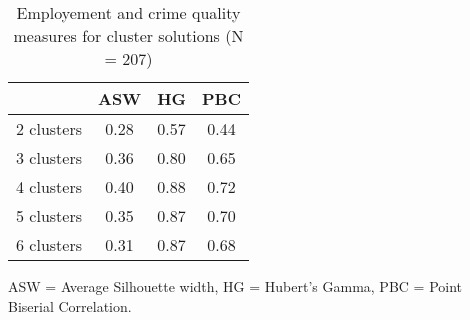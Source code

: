 \begin{table}[htp]
\footnotesize
\setlength{\tabcolsep}{35pt}
\renewcommand{\arraystretch}{1.3}
\begin{threeparttable}
\centering
\caption{Employement and crime quality measures for cluster solutions (N = 207)} 
\label{tab:quality_clusters_job_crime}
\begin{tabular}{lccc}
  \hline
 & ASW & HG & PBC \\ 
  \hline
2 clusters & 0.28 & 0.57 & 0.44 \\ 
  3 clusters & 0.36 & 0.80 & 0.65 \\ 
  4 clusters & 0.40 & 0.88 & 0.72 \\ 
  5 clusters & 0.35 & 0.87 & 0.70 \\ 
  6 clusters & 0.31 & 0.87 & 0.68 \\ 
   \hline
\end{tabular}
\begin{tablenotes}
\scriptsize
\item ASW = Average Silhouette width, HG = Hubert's Gamma, PBC = Point Biserial Correlation.
\end{tablenotes}
\end{threeparttable}
\end{table}
